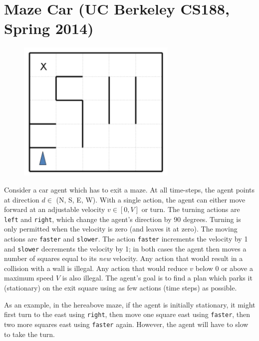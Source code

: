 \documentclass[11pt, a4paper]{article}
\begin{document}
\newpage

\section{Maze Car (UC Berkeley CS188, Spring 2014)}

\begin{figure}[h]
    \centering
    \includegraphics[width=0.3\linewidth]{figures/e1_maze.png}
\end{figure}

Consider a car agent which has to exit a maze. At all time-steps, the agent points at direction $d \in$ (N, S, E, W). With a single action, the agent can either move forward at an adjustable velocity $v \in [0, V]$ or turn. The turning actions are \texttt{left} and \texttt{right}, which change the agent’s direction by 90 degrees. Turning is only permitted when the velocity is zero (and leaves it at zero). The moving actions are \texttt{faster} and \texttt{slower}. The action \texttt{faster} increments the velocity by 1 and \texttt{slower} decrements the velocity by 1; in both cases the agent then moves a number of squares equal to its \emph{new} velocity. Any action that would result in a collision with a wall is illegal. Any action that would reduce $v$ below 0 or above a maximum speed $V$ is also illegal. The agent’s goal is to find a plan which parks it (stationary) on the exit square using as few actions (time steps) as possible.

As an example, in the hereabove maze, if the agent is initially stationary, it might first turn to the east using \texttt{right}, then move one square east using \texttt{faster}, then two more squares east using \texttt{faster} again. However, the agent will have to slow to take the turn.
\end{document}

